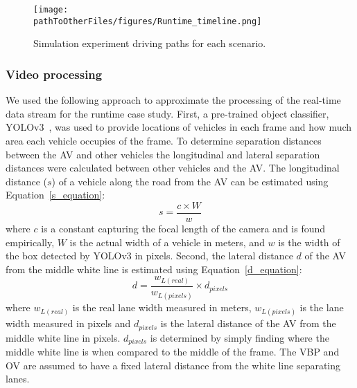 \begin{figure}
    \centering
    \texttt{[image: \\pathToOtherFiles/figures/Runtime\_timeline.png]}
    \caption{Simulation experiment driving paths for each scenario.}
    \label{fig:Runtime_timeline}
\end{figure} 


\subsubsection{Video processing}
%
We used the following approach to approximate the processing of the real-time data stream for the runtime case study. 
%
First, a pre-trained object classifier, YOLOv3~\cite{Yolo}, was used to provide locations of vehicles in each frame and how much area each vehicle occupies of the frame. 
%
To determine separation distances between the AV and other vehicles %
the longitudinal and lateral separation distances were calculated between other vehicles and the AV.
%
The longitudinal distance ($s$) of a vehicle along the road from the AV can be estimated using Equation~\ref{s_equation}:
\begin{equation}\label{s_equation}
    s = \frac{c\times W}{w}
\end{equation}
where $c$ is a constant capturing the focal length of the camera and is found empirically, $W$ is the actual width of a vehicle in meters, and $w$ is the width of the box detected by YOLOv3 in pixels. 
%
Second, the lateral distance $d$ of the AV from the middle white line is estimated using Equation~\ref{d_equation}: 
%
\begin{equation}\label{d_equation}
    d = \frac{w_{L (real)}}{w_{L (pixels)}} \times d_{pixels}
\end{equation}
%
where $w_{L (real)}$ is the real lane width measured in meters, $w_{L (pixels)}$ is the lane width measured in pixels and $d_{pixels}$ is the lateral distance of the AV from the middle white line in pixels. $d_{pixels}$ is determined by simply finding where the middle white line is when compared to the middle of the frame. The VBP and OV are assumed to have a fixed lateral distance from the white line separating lanes. 
